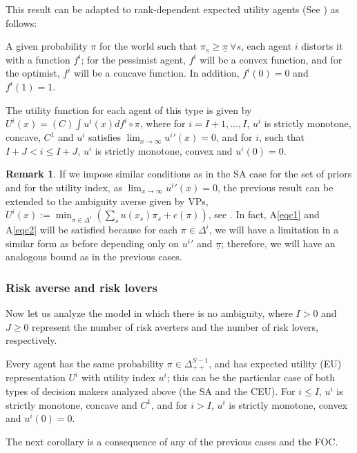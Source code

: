 \documentclass[pdftex]{article}
\numberwithin{equation}{section}
\theoremstyle{th}
\newtheorem{proof lemma}{{Proof Lemma}.}
\theoremstyle{definition}
\newtheorem{remark}{Remark}%
\newtheorem*{risk lovers}{Risk lovers}
\newtheorem*{risk averse}{Risk averse}
\begin{document}
This result can be adapted to rank-dependent expected utility agents (See \cite{Yaari}) as follows:

A given probability $\pi$ for the world such that $\pi_{s}\geq{\underline{\pi}}\ \forall{s}$, each agent $i$ distorts it with a function $f^i$; for the pessimist agent, $f^i$ will be a convex function, and for the optimist, $f^i$ will be a concave function. In addition, $f^i(0)=0$ and $f^i(1)=1$.

The utility function for each agent of this type is given by $U^i(x)=(C)\int{u}^i(x)df^i\circ\pi$, where for $i=I+1,\dots,I$, ${u^i}$ is strictly monotone, concave, $C^1$ and ${u^i}$ satisfies $\lim_{x\rightarrow\infty}{u^i}'(x)=0$, and for $i$, such that $I+J<i\leq{I}+J$, ${u^i}$ is strictly monotone, convex and ${u^i}(0)=0$.

\begin{remark}
If we impose similar conditions as in the SA case for the set of priors and for the utility index, as $\lim_{x\rightarrow\infty}{u^i}'(x)=0$, the previous result can be extended to the ambiguity averse given by VPs, $U^i(x):=\min_{\pi\in\Delta^i}\left(\sum_{s}u\left(x_s\right)\pi_s+c(\pi)\right)$, see \cite{MMR}.
In fact, A\ref{eqc1} and A\ref{eqc2} will be satisfied because for each $\pi\in\Delta^i$, we will have a limitation in a similar form as before depending only on ${u^i}'$ and $\underline{\pi}$; therefore, we will have an analogous bound as in the previous cases.
\end{remark}





\subsubsection{Risk averse and risk lovers}


Now let us analyze the model in which there is no ambiguity, where $I>0$ and $J\geq0$ represent the number of risk averters and the number of risk lovers, respectively.

Every agent has the same probability $\pi\in\Delta_{++}^{S-1}$, and has expected utility (EU) representation $U^i$ with utility index ${u^i}$; this can be the particular case of both types of decision makers analyzed above (the SA and the CEU). For $i\leq{I}$, ${u^i}$ is strictly monotone, concave and $C^1$, and for $i>I$, ${u^i}$ is strictly monotone, convex and ${u^i}(0)=0$.

The next corollary is a consequence of any of the previous cases and the FOC.
\end{document}
